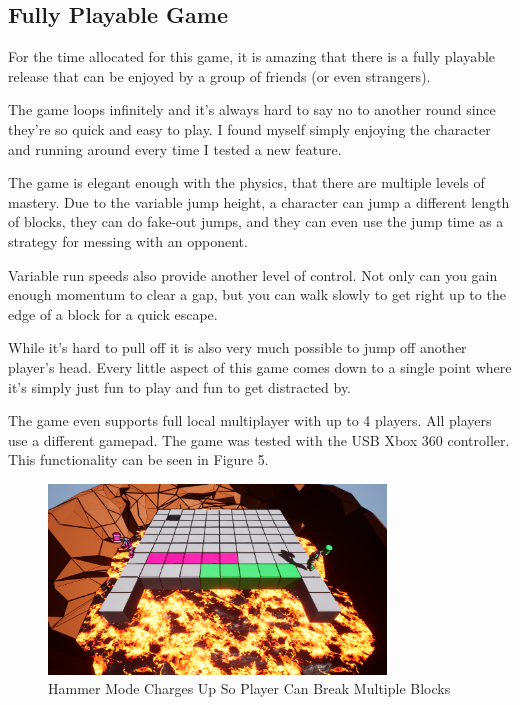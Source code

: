 \documentclass[conference,compsoc]{IEEEtran}
\begin{document}
\subsection{Fully Playable Game}

For the time allocated for this game, it is amazing that there is a fully playable release that can be enjoyed by a group of friends (or even strangers).

The game loops infinitely and it's always hard to say no to another round since they're so quick and easy to play. I found myself simply enjoying the character and running around every time I tested a new feature.

The game is elegant enough with the physics, that there are multiple levels of mastery. Due to the variable jump height, a character can jump a different length of blocks, they can do fake-out jumps, and they can even use the jump time as a strategy for messing with an opponent.

Variable run speeds also provide another level of control. Not only can you gain enough momentum to clear a gap, but you can walk slowly to get right up to the edge of a block for a quick escape.

While it's hard to pull off it is also very much possible to jump off another player's head. Every little aspect of this game comes down to a single point where it's simply just fun to play and fun to get distracted by.

The game even supports full  local multiplayer with up to 4 players. All players use a different gamepad. The game was tested with the USB Xbox 360 controller. This functionality can be seen in Figure 5.

\begin{figure}[b]
  \centering
  \includegraphics[width=0.8\textwidth]{blockscharging1.png}%
  \caption{Hammer Mode Charges Up So Player Can Break Multiple Blocks}
\end{figure}
\end{document}
